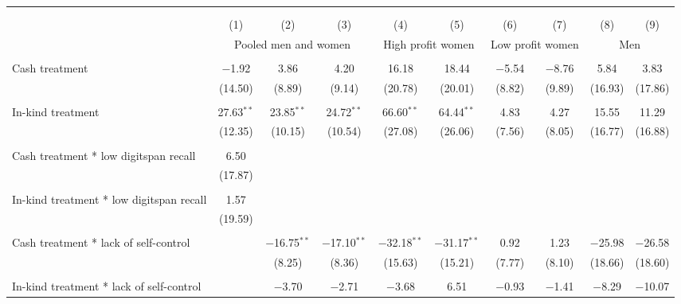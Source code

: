 \documentclass{report}
\begin{document}
\pagestyle{empty}

\begin{table}[!htbp] \centering 
  \caption{} 
  \label{} 
\begin{tabular}{@{\extracolsep{5pt}}lccccccccc} 
\\[-1.8ex]\hline 
\hline \\[-1.8ex] 
\\[-1.8ex] & (1) & (2) & (3) & (4) & (5) & (6) & (7) & (8) & (9)\\ 
 & \multicolumn{3}{c}{Pooled men and women} & \multicolumn{2}{c}{High profit women} & \multicolumn{2}{c}{Low profit women} & \multicolumn{2}{c}{Men} \\ 
\hline \\[-1.8ex] 
 Cash treatment & $-$1.92 & 3.86 & 4.20 & 16.18 & 18.44 & $-$5.54 & $-$8.76 & 5.84 & 3.83 \\ 
  & (14.50) & (8.89) & (9.14) & (20.78) & (20.01) & (8.82) & (9.89) & (16.93) & (17.86) \\ 
  & & & & & & & & & \\ 
 In-kind treatment & 27.63$^{**}$ & 23.85$^{**}$ & 24.72$^{**}$ & 66.60$^{**}$ & 64.44$^{**}$ & 4.83 & 4.27 & 15.55 & 11.29 \\ 
  & (12.35) & (10.15) & (10.54) & (27.08) & (26.06) & (7.56) & (8.05) & (16.77) & (16.88) \\ 
  & & & & & & & & & \\ 
 Cash treatment * low digitspan recall & 6.50 &  &  &  &  &  &  &  &  \\ 
  & (17.87) &  &  &  &  &  &  &  &  \\ 
  & & & & & & & & & \\ 
 In-kind treatment * low digitspan recall & 1.57 &  &  &  &  &  &  &  &  \\ 
  & (19.59) &  &  &  &  &  &  &  &  \\ 
  & & & & & & & & & \\ 
 Cash treatment * lack of self-control &  & $-$16.75$^{**}$ & $-$17.10$^{**}$ & $-$32.18$^{**}$ & $-$31.17$^{**}$ & 0.92 & 1.23 & $-$25.98 & $-$26.58 \\ 
  &  & (8.25) & (8.36) & (15.63) & (15.21) & (7.77) & (8.10) & (18.66) & (18.60) \\ 
  & & & & & & & & & \\ 
 In-kind treatment * lack of self-control &  & $-$3.70 & $-$2.71 & $-$3.68 & 6.51 & $-$0.93 & $-$1.41 & $-$8.29 & $-$10.07 \\ 

\end{tabular}
\end{table}
\end{document}
